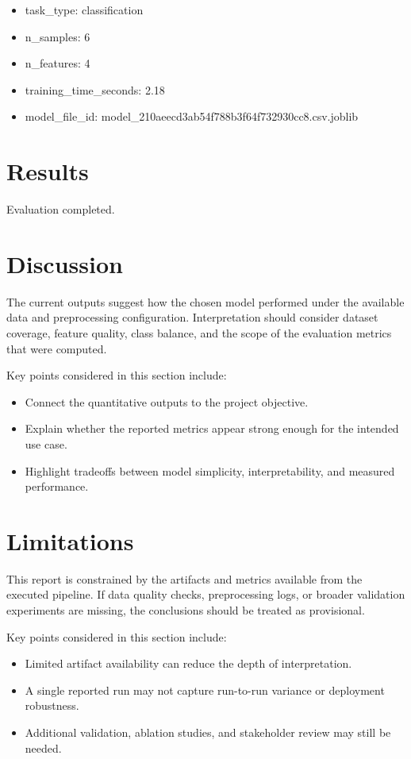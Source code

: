 \documentclass[11pt]{article}
\begin{document}
\begin{itemize}
\item task\_type: classification
\item n\_samples: 6
\item n\_features: 4
\item training\_time\_seconds: 2.18
\item model\_file\_id: model\_210aeecd3ab54f788b3f64f732930cc8.csv.joblib
\end{itemize}


\section{Results}
Evaluation completed.

\section{Discussion}
The current outputs suggest how the chosen model performed under the available data and preprocessing configuration. Interpretation should consider dataset coverage, feature quality, class balance, and the scope of the evaluation metrics that were computed.

Key points considered in this section include:

\begin{itemize}
\item Connect the quantitative outputs to the project objective.
\item Explain whether the reported metrics appear strong enough for the intended use case.
\item Highlight tradeoffs between model simplicity, interpretability, and measured performance.
\end{itemize}


\section{Limitations}
This report is constrained by the artifacts and metrics available from the executed pipeline. If data quality checks, preprocessing logs, or broader validation experiments are missing, the conclusions should be treated as provisional.

Key points considered in this section include:

\begin{itemize}
\item Limited artifact availability can reduce the depth of interpretation.
\item A single reported run may not capture run-to-run variance or deployment robustness.
\item Additional validation, ablation studies, and stakeholder review may still be needed.
\end{itemize}
\end{document}

